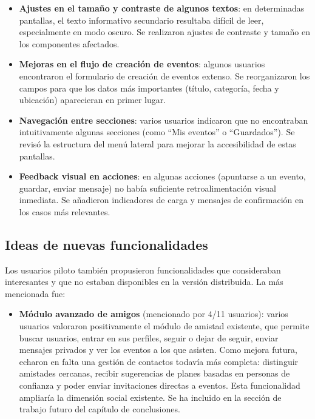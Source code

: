 \begin{itemize}
    \item \textbf{Ajustes en el tamaño y contraste de algunos textos}: en determinadas pantallas, el texto informativo secundario resultaba difícil de leer, especialmente en modo oscuro. Se realizaron ajustes de contraste y tamaño en los componentes afectados.

    \item \textbf{Mejoras en el flujo de creación de eventos}: algunos usuarios encontraron el formulario de creación de eventos extenso. Se reorganizaron los campos para que los datos más importantes (título, categoría, fecha y ubicación) aparecieran en primer lugar.

    \item \textbf{Navegación entre secciones}: varios usuarios indicaron que no encontraban intuitivamente algunas secciones (como ``Mis eventos'' o ``Guardados''). Se revisó la estructura del menú lateral para mejorar la accesibilidad de estas pantallas.

    \item \textbf{Feedback visual en acciones}: en algunas acciones (apuntarse a un evento, guardar, enviar mensaje) no había suficiente retroalimentación visual inmediata. Se añadieron indicadores de carga y mensajes de confirmación en los casos más relevantes.
\end{itemize}

\subsection{Ideas de nuevas funcionalidades}

Los usuarios piloto también propusieron funcionalidades que consideraban interesantes y que no estaban disponibles en la versión distribuida. La más mencionada fue:

\begin{itemize}
    \item \textbf{Módulo avanzado de amigos} (mencionado por 4/11 usuarios): varios usuarios valoraron positivamente el módulo de amistad existente, que permite buscar usuarios, entrar en sus perfiles, seguir o dejar de seguir, enviar mensajes privados y ver los eventos a los que asisten. Como mejora futura, echaron en falta una gestión de contactos todavía más completa: distinguir amistades cercanas, recibir sugerencias de planes basadas en personas de confianza y poder enviar invitaciones directas a eventos. Esta funcionalidad ampliaría la dimensión social existente. Se ha incluido en la sección de trabajo futuro del capítulo de conclusiones.
\end{itemize}

